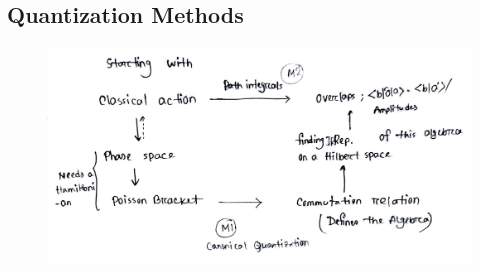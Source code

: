 \documentclass[14pt]{article} %
\begin{document}
\subsection{Quantization Methods}
\begin{figure}[H]
    \centering
    \includegraphics[width=1.1\linewidth]{figures/C10_1.jpeg}
    \caption*{}
\end{figure}



\end{document}
